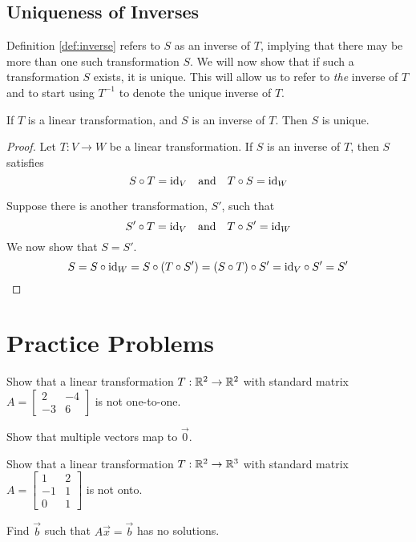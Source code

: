 \documentclass{ximera}
\begin{document}
\subsection*{Uniqueness of Inverses}

Definition \ref{def:inverse} refers to $S$ as an inverse of $T$, implying that there may be more than one such transformation $S$.  We will now show that if such a transformation $S$ exists, it is unique.  This will allow us to refer to {\it the} inverse of $T$ and to start using $T^{-1}$ to denote the unique inverse of $T$.

\begin{theorem}\label{th:inverseisunique}
If $T$ is a linear transformation, and $S$ is an inverse of $T$.  Then $S$ is unique.
\end{theorem}
\begin{proof}
Let $T:V\rightarrow W$ be a linear transformation.  If $S$ is an inverse of $T$, then $S$ satisfies
$$S\circ T=\text{id}_V\quad \text{and}\quad T\circ S=\text{id}_W$$

Suppose there is another transformation, $S'$, such that 
$$S'\circ T=\text{id}_V\quad \text{and}\quad T\circ S'=\text{id}_W$$
We now show that $S=S'$.
$$S=S\circ \text{id}_W=S\circ(T\circ S')=(S\circ T)\circ S'=\text{id}_V\circ S'=S'$$
\end{proof}

\section*{Practice Problems}
\begin{problem}
Show that a linear transformation $T:\mathbb{R}^2\rightarrow \mathbb{R}^2$ with standard matrix $A=\begin{bmatrix}2&-4\\-3&6\end{bmatrix}$ is not one-to-one.
\begin{hint}
        Show that multiple vectors map to $\vec{0}$.
      \end{hint}
\end{problem}
 
 \begin{problem}
 Show that a linear transformation $T:\mathbb{R}^2\rightarrow \mathbb{R}^3$ with standard matrix $A=\begin{bmatrix}1&2\\-1&1\\0&1\end{bmatrix}$ is not onto.
 \begin{hint}
 Find $\vec{b}$ such that $A\vec{x}=\vec{b}$ has no solutions.
 \end{hint}
 \end{problem}
 
\end{document}
